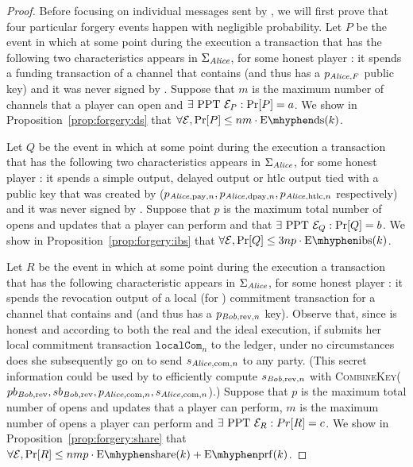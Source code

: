\begin{proof}
  Before focusing on individual messages sent by \environment, we will first
  prove that four particular forgery events happen with negligible probability.
  Let $P$ be the event in which at some point during the execution a transaction
  that has the following two characteristics appears in $\Sigma_{\mathit{Alice}}$, for
  some honest player \alice: it spends a funding transaction of a channel that
  contains \alice{} (and thus has a $p_{\mathit{Alice}, F}$ public key) and it was never
  signed by \alice. Suppose that $m$ is the maximum number of channels that a
  player can open and $\exists \text{ PPT } \mathcal{E}_P: \Pr[P] = a$. We show
  in Proposition~\ref{prop:forgery:ds} that $\forall \environment, \Pr[P] \leq
  nm \cdot \mathrm{E \mhyphen ds}(k)$.

  Let $Q$ be the event in which at some point during the execution a transaction
  that has the following two characteristics appears in $\Sigma_{\mathit{Alice}}$, for
  some honest player \alice: it spends a simple output, delayed output or htlc
  output tied with a public key that was created by \alice{} ($p_{\mathit{Alice},
  \mathrm{pay}, n}, p_{\mathit{Alice}, \mathrm{dpay}, n}, p_{\mathit{Alice}, \mathrm{htlc}, n}$
  respectively) and it was never signed by \alice. Suppose that $p$ is the
  maximum total number of opens and updates that a player can perform and that
  $\exists \text{ PPT } \mathcal{E}_Q: \Pr[Q] = b$. We show
  in Proposition~\ref{prop:forgery:ibs} that $\forall \environment, \Pr[Q] \leq
  3np \cdot \mathrm{E \mhyphen ibs}(k)$.

  Let $R$ be the event in which at some point during the execution a transaction
  that has the following characteristic appears in $\Sigma_{\mathit{Alice}}$, for some
  honest player \alice: it spends the revocation output of a local (for
  \alice{}) commitment transaction for a channel that contains \alice{} and
  \bob{} (and thus has a $p_{\mathit{Bob}, \mathrm{rev}, n}$ key). Observe that, since
  \alice{} is honest and according to both the real and the ideal execution, if
  \alice{} submits her local commitment transaction $\mathtt{localCom}_n$ to the
  ledger, under no circumstances does she subsequently go on to send $s_{\mathit{Alice},
  \mathrm{com}, n}$ to any party. (This secret information could be used by
  \bob{} to efficiently compute $s_{\mathit{Bob}, \mathrm{rev}, n}$ with
  \textsc{CombineKey}($pb_{\mathit{Bob}, \mathrm{rev}}, sb_{\mathit{Bob}, \mathrm{rev}},
  p_{\mathit{Alice}, \mathrm{com}, n}, s_{\mathit{Alice}, \mathrm{com}, n}$).) Suppose that $p$
  is the maximum total number of opens and updates that a player can perform,
  $m$ is the maximum number of opens a player can perform and $\exists \text{
  PPT } \mathcal{E}_R: Pr[R] = c$. We show in
  Proposition~\ref{prop:forgery:share} that $\forall \environment, \Pr[R] \leq
  nmp \cdot \mathrm{E \mhyphen share}(k) + \mathrm{E \mhyphen prf}(k)$.


\end{proof}
